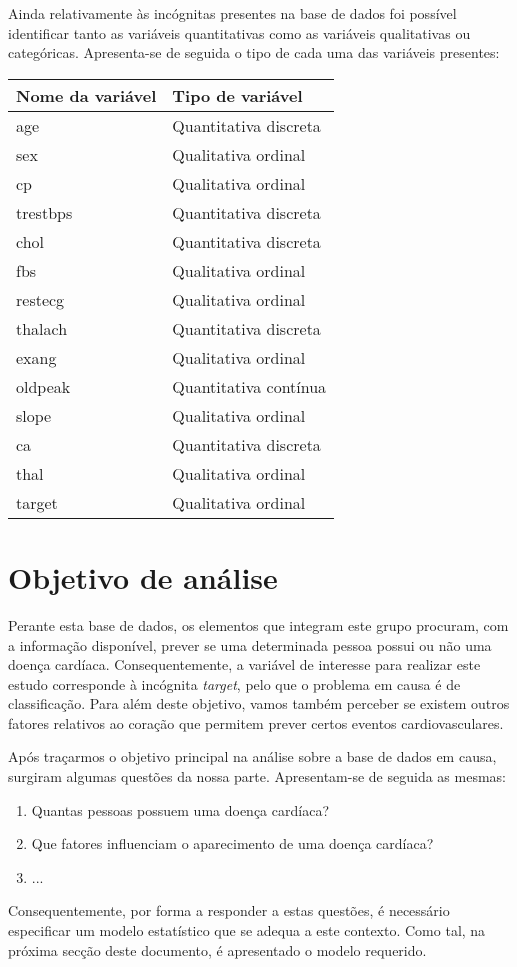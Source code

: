\documentclass[a4paper]{report}
\begin{document}
{	Ainda relativamente às incógnitas presentes na base de dados foi possível identificar tanto as variáveis quantitativas como as variáveis qualitativas ou categóricas. 
	Apresenta-se de seguida o tipo de cada uma das variáveis presentes:
	\begin{center}
		\begin{tabular}{ | l | l | }
		\hline
		\textbf{Nome da variável} & \textbf{Tipo de variável} \\ \hline
		age & Quantitativa discreta \\ \hline
		sex & Qualitativa ordinal \\ \hline
		cp & Qualitativa ordinal \\ \hline
		trestbps & Quantitativa discreta \\ \hline
		chol & Quantitativa discreta \\ \hline
		fbs & Qualitativa ordinal \\ \hline
		restecg & Qualitativa ordinal \\ \hline
		thalach & Quantitativa discreta \\ \hline
		exang & Qualitativa ordinal \\ \hline
		oldpeak & Quantitativa contínua \\ \hline
		slope & Qualitativa ordinal \\ \hline
		ca & Quantitativa discreta \\ \hline
		thal & Qualitativa ordinal \\ \hline
		target & Qualitativa ordinal \\ \hline
		\end{tabular}
	\end{center}
	
	\section{Objetivo de análise}
	Perante esta base de dados, os elementos que integram este grupo procuram, com a informação disponível, prever se uma determinada pessoa possui ou não uma doença cardíaca. Consequentemente,
	a variável de interesse para realizar este estudo corresponde à incógnita \textit{target}, pelo que o problema em causa é de classificação.
	Para além deste objetivo, vamos também perceber se existem outros fatores relativos ao coração que permitem prever certos eventos cardiovasculares. 
	
	Após traçarmos o objetivo principal na análise sobre a base de dados em causa, surgiram algumas questões da nossa parte. Apresentam-se de seguida as mesmas:
	\begin{enumerate}
	    \item Quantas pessoas possuem uma doença cardíaca?
	    \item Que fatores influenciam o aparecimento de uma doença cardíaca?
	    \item ...
	\end{enumerate}
	
	Consequentemente, por forma a responder a estas questões, é necessário especificar um modelo estatístico que se adequa a este contexto. Como tal, na próxima secção deste documento, 
	é apresentado o modelo requerido.
}
\end{document}
